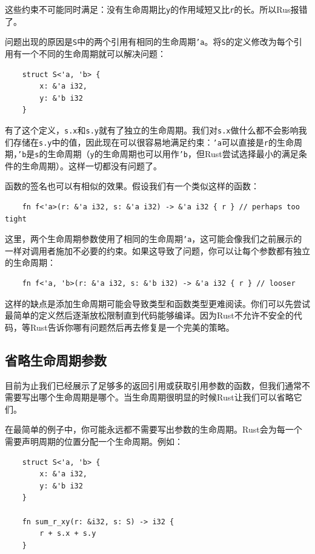 这些约束不可能同时满足：没有生命周期比\texttt{y}的作用域短又比\texttt{r}的长。所以Rus报错了。

问题出现的原因是\texttt{S}中的两个引用有相同的生命周期\texttt{'a}。将\texttt{S}的定义修改为每个引用有一个不同的生命周期就可以解决问题：
\begin{verbatim}
    struct S<'a, 'b> {
        x: &'a i32,
        y: &'b i32
    }
\end{verbatim}

有了这个定义，\texttt{s.x}和\texttt{s.y}就有了独立的生命周期。我们对\texttt{s.x}做什么都不会影响我们存储在\texttt{s.y}中的值，因此现在可以很容易地满足约束：\texttt{'a}可以直接是\texttt{r}的生命周期，\texttt{'b}是\texttt{s}的生命周期（\texttt{y}的生命周期也可以用作\texttt{'b}，但Rust尝试选择最小的满足条件的生命周期）。这样一切都没有问题了。

函数的签名也可以有相似的效果。假设我们有一个类似这样的函数：
\begin{verbatim}
    fn f<'a>(r: &'a i32, s: &'a i32) -> &'a i32 { r } // perhaps too tight
\end{verbatim}

这里，两个生命周期参数使用了相同的生命周期\texttt{'a}，这可能会像我们之前展示的一样对调用者施加不必要的约束。如果这导致了问题，你可以让每个参数都有独立的生命周期：
\begin{verbatim}
    fn f<'a, 'b>(r: &'a i32, s: &'b i32) -> &'a i32 { r } // looser
\end{verbatim}

这样的缺点是添加生命周期可能会导致类型和函数类型更难阅读。你们可以先尝试最简单的定义然后逐渐放松限制直到代码能够编译。因为Rust不允许不安全的代码，等Rust告诉你哪有问题然后再去修复是一个完美的策略。

\subsection{省略生命周期参数}
目前为止我们已经展示了足够多的返回引用或获取引用参数的函数，但我们通常不需要写出哪个生命周期是哪个。当生命周期很明显的时候Rust让我们可以省略它们。

在最简单的例子中，你可能永远都不需要写出参数的生命周期。Rust会为每一个需要声明周期的位置分配一个生命周期。例如：
\begin{verbatim}
    struct S<'a, 'b> {
        x: &'a i32,
        y: &'b i32
    }

    fn sum_r_xy(r: &i32, s: S) -> i32 {
        r + s.x + s.y
    }
\end{verbatim}

